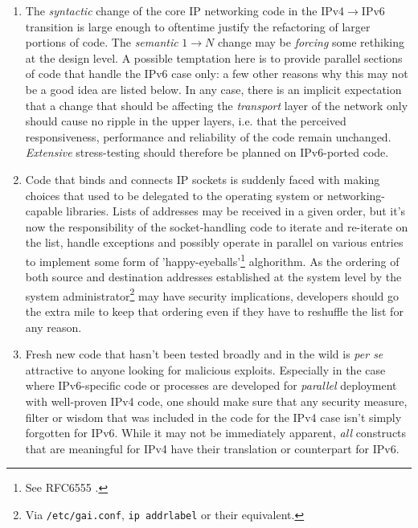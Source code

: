 \begin{enumerate}
\item The {\it syntactic} change of the core IP networking code in the
      IPv4$\rightarrow$IPv6 transition is large enough to oftentime
      justify the refactoring of larger portions of code. The 
      {\it semantic} $1\rightarrow N$ change may be {\it forcing}
      some rethiking at the design level. A possible temptation here
      is to provide parallel sections of code that handle the IPv6 case
      only: a few other reasons why this may not be a good idea are
      listed below. In any case, there is an implicit expectation that 
      a change that should be affecting the {\it transport} layer of
      the network only should cause no ripple in the upper layers, i.e.
      that the perceived responsiveness, performance and reliability
      of the code remain unchanged. {\it Extensive} stress-testing should
      therefore be planned on IPv6-ported code. 
\item Code that binds and connects IP sockets is suddenly faced with 
      making choices that used to be delegated to the operating system or
      networking-capable libraries. Lists of addresses may be received in
      a given order, but it's now the responsibility of the socket-handling
      code to iterate and re-iterate on the list, handle exceptions and
      possibly operate in parallel on various entries
      to implement some form of 'happy-eyeballs'\footnote{See RFC6555 \cite{rfc}.}
      alghorithm. As the ordering of both source and destination addresses
      established at the system level by the system
      administrator\footnote{Via {\tt /etc/gai.conf}, {\tt ip addrlabel} or their equivalent.}
      may have security implications, developers should go the extra mile to 
      keep that ordering even if they have to reshuffle the list for any reason.
\item Fresh new code that hasn't been tested broadly and in the 
      wild is {\it per se} attractive to anyone looking for
      malicious exploits. Especially in the case where IPv6-specific
      code or processes are developed for {\it parallel} deployment with
      well-proven IPv4 code, one should make sure that any security measure,
      filter or wisdom that was included in the code for the IPv4 case isn't
      simply forgotten for IPv6. While it may not be immediately apparent,
      {\it all} constructs that are meaningful for IPv4 have their
      translation or counterpart for IPv6.
\end{enumerate}
